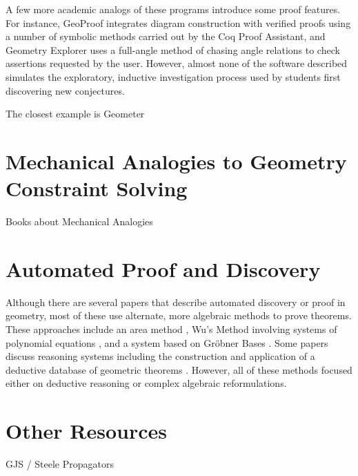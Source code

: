 A few more academic analogs of these programs introduce some proof
features.  For instance, GeoProof \cite{geoProof} integrates diagram
construction with verified proofs using a number of symbolic methods
carried out by the Coq Proof Assistant, and Geometry Explorer
\cite{geoExplorer} uses a full-angle method of chasing angle relations
to check assertions requested by the user.  However, almost none of
the software described simulates the exploratory, inductive
investigation process used by students first discovering new
conjectures.

The closest example is Geometer

\section{Mechanical Analogies to Geometry Constraint Solving}

Books about Mechanical Analogies

\section{Automated Proof and Discovery}
Although there are several papers that describe automated discovery or
proof in geometry, most of these use alternate, more algebraic methods
to prove theorems.  These approaches include an area method
\cite{autoTools}, Wu's Method involving systems of polynomial
equations \cite{wuMethod}, and a system based on Gr\"obner Bases
\cite{grobner}.  Some papers discuss reasoning systems including the
construction and application of a deductive database of geometric
theorems \cite{deductiveDatabase}.  However, all of these methods
focused either on deductive reasoning or complex algebraic
reformulations.

\section{Other Resources}

GJS / Steele Propagators
